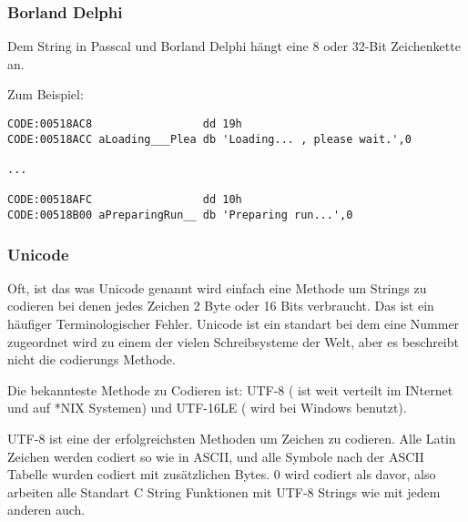 
\subsubsection{Borland Delphi}

Dem String in Passcal und Borland Delphi hängt eine 8 oder 32-Bit Zeichenkette an. 

Zum Beispiel:

\begin{lstlisting}[caption=Delphi,style=customasmx86]
CODE:00518AC8                 dd 19h
CODE:00518ACC aLoading___Plea db 'Loading... , please wait.',0

...

CODE:00518AFC                 dd 10h
CODE:00518B00 aPreparingRun__ db 'Preparing run...',0
\end{lstlisting}

\subsubsection{Unicode}


Oft, ist das was Unicode genannt wird einfach eine Methode um Strings zu codieren bei denen jedes Zeichen 2 Byte oder 
16 Bits verbraucht. Das ist ein häufiger Terminologischer Fehler. Unicode ist ein standart bei dem eine Nummer zugeordnet
wird zu einem der vielen Schreibsysteme der Welt, aber es beschreibt nicht die codierungs Methode. 


Die bekannteste Methode zu Codieren ist: UTF-8 ( ist weit verteilt im INternet und auf *NIX Systemen) und UTF-16LE ( wird bei Windows benutzt). 


UTF-8 ist eine der erfolgreichsten Methoden um Zeichen zu codieren.
Alle Latin Zeichen werden codiert so wie in ASCII, und alle Symbole nach der
ASCII Tabelle wurden codiert mit zusätzlichen Bytes. 0 wird codiert als davor,
also arbeiten alle Standart C String Funktionen mit UTF-8 Strings wie mit jedem anderen auch.

